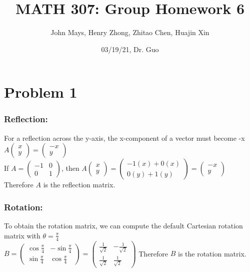 \documentclass{article}
\title{\textbf{MATH 307: Group Homework 6}}
\author{John Mays, Henry Zhong, Zhitao Chen, Huajin Xin}
\date{03/19/21, Dr. Guo}
\begin{document}
\maketitle

\section*{Problem 1}
\subsubsection*{Reflection: }
For a reflection across the y-axis, the x-component of a vector must become -x\\
$A\begin{pmatrix}x\\ y\end{pmatrix} = \begin{pmatrix}-x\\ y\end{pmatrix}$\\
If $A = \begin{pmatrix}-1 & 0\\ 0 & 1\end{pmatrix}$, then $A\begin{pmatrix}x\\ y\end{pmatrix}=\begin{pmatrix}-1(x)+0(x)\\ 0(y)+1(y)\end{pmatrix}=\begin{pmatrix}-x\\ y\end{pmatrix}$\\
Therefore $A$ is the reflection matrix.
\subsubsection*{Rotation: }
To obtain the rotation matrix, we can compute the default Cartesian rotation matrix with $\theta = \frac{\pi}{4}$\\
$B=\begin{pmatrix}\cos{\frac{\pi}{4}} & -\sin{\frac{\pi}{4}}\\ \sin{\frac{\pi}{4}} & \cos{\frac{\pi}{4}}\ \end{pmatrix}=\begin{pmatrix}\frac{1}{\sqrt{2}} & -\frac{1}{\sqrt{2}}\\ \frac{1}{\sqrt{2}} & \frac{1}{\sqrt{2}} \end{pmatrix}$
Therefore $B$ is the rotation matrix.
\end{document}
